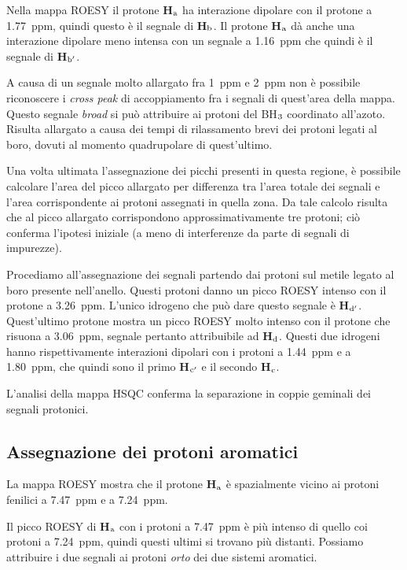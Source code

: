 \documentclass[a4paper, italian, oneside, 12pt]{article}
\begin{document}
Nella mappa ROESY il protone {\bf{H$_{\textrm a}$}} ha interazione dipolare con il protone a 1.77~ppm, quindi questo è il segnale di {\bf{H$_{\textrm b}$}}. Il protone {\bf{H$_{\textrm a}$}} dà anche una interazione dipolare meno intensa con un segnale a 1.16~ppm che quindi è il segnale di {\bf{H$_{\textrm b'}$}}.

A causa di un segnale molto allargato fra 1~ppm e 2~ppm non è possibile riconoscere i {\emph{cross peak}} di accoppiamento fra i segnali di quest'area della mappa. Questo segnale \emph{broad} si può attribuire ai protoni del BH$_{\textrm 3}$ coordinato all'azoto. Risulta allargato a causa dei tempi di rilassamento brevi dei protoni legati al boro, dovuti al momento quadrupolare di quest'ultimo. 

Una volta ultimata l'assegnazione dei picchi presenti in questa regione, è possibile calcolare l'area del picco allargato per differenza tra l'area totale dei segnali e l'area corrispondente ai protoni assegnati in quella zona. Da tale calcolo risulta che al picco allargato corrispondono approssimativamente tre protoni; ciò conferma l'ipotesi iniziale (a meno di interferenze da parte di segnali di impurezze).

Procediamo all'assegnazione dei segnali partendo dai protoni sul metile legato al boro presente nell'anello. Questi protoni danno un picco ROESY intenso con il protone a 3.26~ppm. L'unico idrogeno che può dare questo segnale è {\bf{H$_{\textrm d'}$}}. Quest'ultimo protone mostra un picco ROESY molto intenso con il protone che risuona a 3.06~ppm, segnale pertanto attribuibile ad {\bf{H$_{\textrm d}$}}.
Questi due idrogeni hanno rispettivamente interazioni dipolari con i protoni a 1.44~ppm e a 1.80~ppm, che quindi sono il primo {\bf{H$_{\textrm c'}$}} e il secondo {\bf{H$_{\textrm c}$}}. 

L'analisi della mappa HSQC conferma la separazione in coppie geminali dei segnali protonici.

\subsection{Assegnazione dei protoni aromatici}

La mappa ROESY mostra che il protone {\bf{H$_{\textrm a}$}} è spazialmente vicino ai protoni fenilici a 7.47~ppm e a 7.24~ppm.

Il picco ROESY di {\bf{H$_{\textrm a}$}} con i protoni a 7.47~ppm è più intenso di quello coi protoni a 7.24~ppm, quindi questi ultimi si trovano più distanti. Possiamo attribuire i due segnali ai protoni \emph{orto} dei due sistemi aromatici. 
\end{document}
